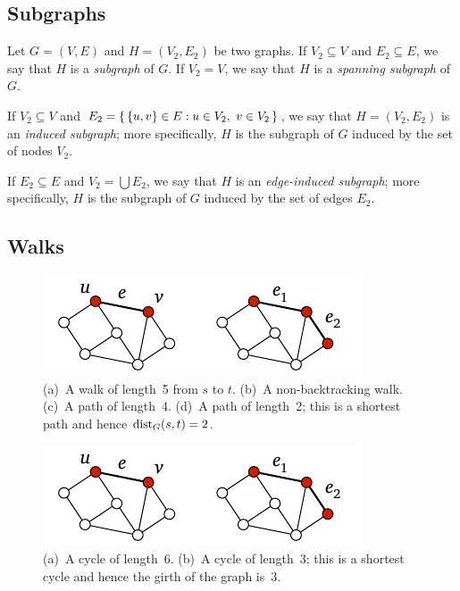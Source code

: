 \subsection{Subgraphs}

Let $G = (V,E)$ and $H = (V_2,E_2)$ be two graphs. If $V_2 \subseteq V$ and $E_2 \subseteq E$, we say that $H$ is a \emph{subgraph} of $G$. If $V_2 = V$, we say that $H$ is a \emph{spanning subgraph} of $G$.

If $V_2 \subseteq V$ and $E_2 = \{\,  \{u,v\} \in E : u \in V_2,\ v \in V_2  \,\}$, we say that $H = (V_2,E_2)$ is an \emph{induced subgraph}; more specifically, $H$ is the subgraph of $G$ induced by the set of nodes $V_2$.

If $E_2 \subseteq E$ and $V_2 = \bigcup E_2$, we say that $H$ is an \emph{edge-induced subgraph}; more specifically, $H$ is the subgraph of $G$ induced by the set of edges $E_2$.


\subsection{Walks}

\begin{figure}
    \centering
    \includegraphics[page=\PWalk]{figs.pdf}
    \caption{
        (a)~A walk of length~5 from $s$ to $t$.
        (b)~A non-backtracking walk.
        (c)~A path of length~4.
        (d)~A path of length~2; this is a shortest path and hence $\operatorname{dist}_G(s,t) = 2$.
    }\label{fig:walk}
\end{figure}

\begin{figure}
    \centering
    \includegraphics[page=\PCycle]{figs.pdf}
    \caption{
        (a)~A cycle of length~6.
        (b)~A cycle of length~3; this is a shortest cycle and hence the girth of the graph is~$3$.
    }\label{fig:cycle}
\end{figure}

